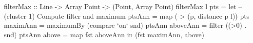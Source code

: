\begin{haskell}[float,caption=Quickhull core (\Hs/filterMax/) implementation,label=figs:clustering:bench:filterMax]
filterMax :: Line -> Array Point -> (Point, Array Point)
filterMax l pts
 = let -- (cluster 1) Compute filter and maximum 
       ptsAnn   = map (\p -> (p, distance p l)) pts
       maximAnn = maximumBy (compare `on` snd)  ptsAnn
       aboveAnn = filter ((>0) . snd)           ptsAnn
       above    = map fst                       aboveAnn
   in (fst maximAnn, above)
\end{haskell}


